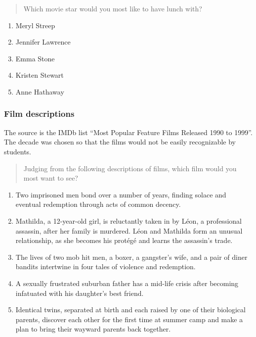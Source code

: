 \documentclass[11pt,letter]{amsart}
\begin{document}
\begin{quotation}
Which movie star would you most like to have lunch with?
\end{quotation}

\begin{enumerate}
\item Meryl Streep 

\item Jennifer Lawrence 

\item Emma Stone 

\item Kristen Stewart 

\item Anne Hathaway
\end{enumerate}

\subsubsection{Film descriptions}

The source is the IMDb list ``Most Popular Feature Films Released 1990 to
1999''. The decade was chosen so that the films would not be easily
recognizable by students.

\begin{quotation}
Judging from the following descriptions of films, which film would you most
want to see?
\end{quotation}

\begin{enumerate}
\item Two imprisoned men bond over a number of years, finding solace and
eventual redemption through acts of common decency. 

\item Mathilda, a 12-year-old girl, is reluctantly taken in by L\'eon, a
professional assassin, after her family is murdered. L\'eon and Mathilda
form an unusual relationship, as she becomes his prot\'eg\'e and learns the
assassin's trade. 

\item The lives of two mob hit men, a boxer, a gangster's wife, and a pair
of diner bandits intertwine in four tales of violence and redemption. 

\item A sexually frustrated suburban father has a mid-life crisis after
becoming infatuated with his daughter's best friend. 

\item Identical twins, separated at birth and each raised by one of their
biological parents, discover each other for the first time at summer camp
and make a plan to bring their wayward parents back together.
\end{enumerate}
\end{document}
